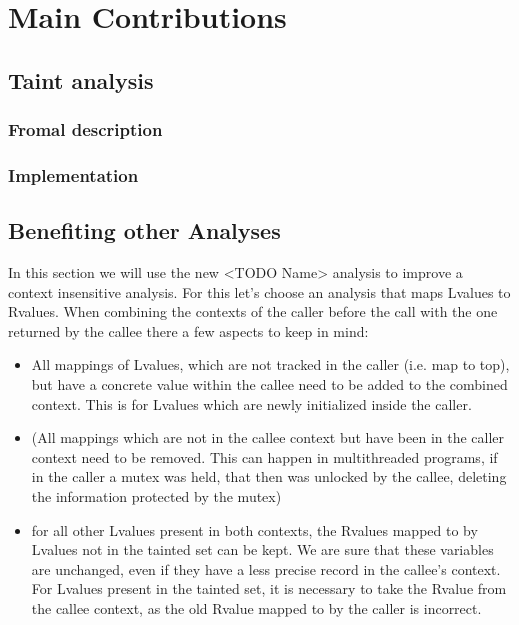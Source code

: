
\chapter{Main Contributions}\label{chapter:mainContributions}

  \section{Taint analysis}
    
    \subsection{Fromal description}

    \subsection{Implementation}

  \section{Benefiting other Analyses}
  In this section we will use the new <TODO Name> analysis to improve a context insensitive analysis. For this let's choose an analysis that maps Lvalues to Rvalues.
  When combining the contexts of the caller before the call with the one returned by the callee there a few aspects to keep in mind:
  \begin{itemize}
    \item All mappings of Lvalues, which are not tracked in the caller (i.e. map to top), but have a concrete value within the callee need to be added to the combined context. This is for Lvalues which are newly initialized inside the caller.
    \item (All mappings which are not in the callee context but have been in the caller context need to be removed. This can happen in multithreaded programs, if in the caller a mutex was held, that then was unlocked by the callee, deleting the information protected by the mutex)
    \item for all other Lvalues present in both contexts, the Rvalues mapped to by Lvalues not in the tainted set can be kept. We are sure that these variables are unchanged, even if they have a less precise record in the callee's context. For Lvalues present in the tainted set, it is necessary to take the Rvalue from the callee context, as the old Rvalue mapped to by the caller is incorrect.
  \end{itemize}


